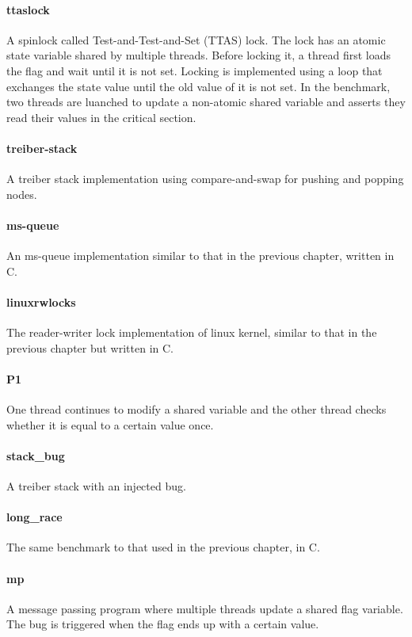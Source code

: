 \paragraph{ttaslock} A spinlock called Test-and-Test-and-Set (TTAS) lock. The lock has an atomic state variable shared by multiple threads. Before locking it, a thread first loads the flag and wait until it is not set. Locking is implemented using a loop that exchanges the state value until the old value of it is not set. In the benchmark, two threads are luanched to update a non-atomic shared variable and asserts they read their values in the critical section.

\paragraph{treiber-stack} A treiber stack\cite{treiber-stack} implementation using compare-and-swap for pushing and popping nodes.

\paragraph{ms-queue} An ms-queue implementation similar to that in the previous chapter, written in C.

\paragraph{linuxrwlocks} The reader-writer lock implementation of linux kernel, similar to that in the previous chapter but written in C.

\paragraph{P1} One thread continues to modify a shared variable and the other thread checks whether it is equal to a certain value once.

\paragraph{stack\_bug} A treiber stack with an injected bug. 

\paragraph{long\_race} The same benchmark to that used in the previous chapter, in C.

\paragraph{mp} A message passing program where multiple threads update a shared flag variable. The bug is triggered when the flag ends up with a certain value. 

